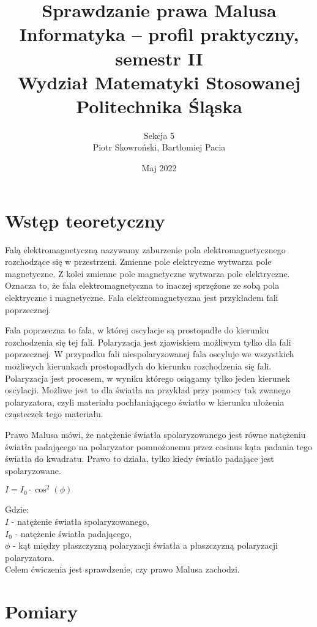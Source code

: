 \documentclass[12pt]{article}
\title{ Sprawdzanie prawa Malusa \\
    \large Informatyka – profil praktyczny, semestr II \\
    Wydział Matematyki Stosowanej \\
    Politechnika Śląska \\}
\author{ Sekcja 5 \\
    Piotr Skowroński, Bartłomiej Pacia}
\date{Maj 2022}
\begin{document}
\maketitle

\section{Wstęp teoretyczny}

Falą elektromagnetyczną nazywamy zaburzenie pola elektromagnetycznego
rozchodzące się w przestrzeni. Zmienne pole elektryczne wytwarza pole
magnetyczne. Z kolei zmienne pole magnetyczne wytwarza pole elektryczne.
Oznacza to, że fala elektromagnetyczna to inaczej sprzężone ze sobą
pola elektryczne i magnetyczne. Fala elektromagnetyczna jest
przykładem fali poprzecznej.

Fala poprzeczna to fala, w której oscylacje są
prostopadłe do kierunku rozchodzenia się tej fali. Polaryzacja
jest zjawiskiem możliwym tylko dla fali poprzecznej. W przypadku
fali niespolaryzowanej fala oscyluje we wszystkich możliwych
kierunkach prostopadłych do kierunku rozchodzenia się fali. Polaryzacja
jest procesem, w wyniku którego osiągamy tylko jeden kierunek oscylacji.
Możliwe jest to dla światła na przykład przy pomocy tak zwanego
polaryzatora, czyli materiału pochłaniającego światło w kierunku
ułożenia cząsteczek tego materiału.

Prawo Malusa mówi, że natężenie światła spolaryzowanego jest równe
natężeniu światła padającego na polaryzator pomnożonemu przez cosinus
kąta padania tego światła do kwadratu. Prawo to działa, tylko kiedy
światło padające jest spolaryzowane.

\begin{center}
    $I = I_0 \cdot \cos^2(\phi)$ \\
\end{center}
Gdzie: \\
\indent $I$ - natężenie światła spolaryzowanego,\\
\indent $I_0$ - natężenie światła padającego, \\
\indent $\phi$ - kąt między płaszczyzną polaryzacji
światła a płaszczyzną polaryzacji polaryzatora. \\
Celem ćwiczenia jest sprawdzenie, czy prawo Malusa zachodzi.

\section{Pomiary}
\end{document}
